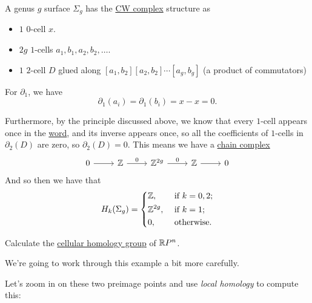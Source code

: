 \begin{eg}
	A genus \(g\) surface \(\Sigma_g\) has the \hyperref[def:CW-Complex]{CW complex} structure as
	\begin{itemize}
		\item \(1\) \(0\)-cell \(x\).
		\item \(2g\) \(1\)-cells \(a_1, b_1, a_2, b_2, \ldots\).
		\item \(1\) \(2\)-cell \(D\) glued along \([a_1, b_2][a_2, b_2]\cdots[a_g, b_g]\) (a product of commutators)
	\end{itemize}

	For \(\partial _1\), we have
	\[
		\partial_1(a_i) = \partial_1(b_i) = x - x = 0.
	\]

	Furthermore, by the principle discussed above, we know that every \(1\)-cell appears once in the \hyperref[def:word]{word}, and its inverse appears once,
	so all the coefficients of \(1\)-cells in \(\partial_2(D)\) are zero, so \(\partial_2(D) = 0\). This means we have a \hyperref[def:cellular-chain-complex]{chain complex}
	\[
		\begin{tikzcd}
			0 & {\mathbb{Z}} & {\mathbb{Z}^{2g}} & {\mathbb{Z}} & 0
			\arrow[from=1-1, to=1-2]
			\arrow["0", from=1-2, to=1-3]
			\arrow["0", from=1-3, to=1-4]
			\arrow[from=1-4, to=1-5]
		\end{tikzcd}
	\]
	And so then we have that
	\[
		H_k(\Sigma _{g} ) = \begin{dcases}
			\mathbb{\MakeUppercase{z}} ,      & \text{ if } k = 0, 2 ; \\
			\mathbb{\MakeUppercase{z}} ^{2g}, & \text{ if } k = 1;     \\
			0,                                & \text{ otherwise}.
		\end{dcases}
	\]
\end{eg}

\begin{exercise}
	Calculate the \hyperref[def:cellular-homology-group]{cellular homology group} of \(\mathbb{\MakeUppercase{r}} P^n\).
\end{exercise}

\begin{eg}
	We're going to work through this example a bit more carefully.
	\begin{figure}[H]
		\centering
		\label{fig:eg:more-careful-torus-cellular}
	\end{figure}
	Let's zoom in on these two preimage points and use \emph{local homology} to compute this:
\end{eg}